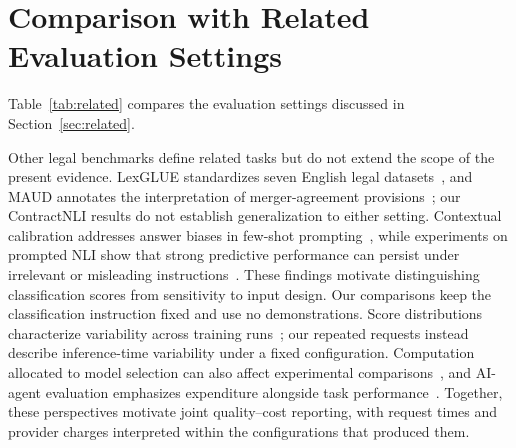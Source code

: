 \documentclass{article}
\begin{document}






\section{Comparison with Related Evaluation Settings}
\label{app:related}
Table~\ref{tab:related} compares the evaluation settings discussed in Section~\ref{sec:related}.

Other legal benchmarks define related tasks but do not extend the scope of the present evidence. LexGLUE standardizes seven English legal datasets~\citep{chalkidis2022lexglue}, and MAUD annotates the interpretation of merger-agreement provisions~\citep{wang2023maud}; our ContractNLI results do not establish generalization to either setting. Contextual calibration addresses answer biases in few-shot prompting~\citep{zhao2021calibrate}, while experiments on prompted NLI show that strong predictive performance can persist under irrelevant or misleading instructions~\citep{webson2022prompts}. These findings motivate distinguishing classification scores from sensitivity to input design. Our comparisons keep the classification instruction fixed and use no demonstrations. Score distributions characterize variability across training runs~\citep{reimers2017score}; our repeated requests instead describe inference-time variability under a fixed configuration. Computation allocated to model selection can also affect experimental comparisons~\citep{dodge2019show}, and AI-agent evaluation emphasizes expenditure alongside task performance~\citep{kapoor2025agents}. Together, these perspectives motivate joint quality--cost reporting, with request times and provider charges interpreted within the configurations that produced them.
\end{document}
